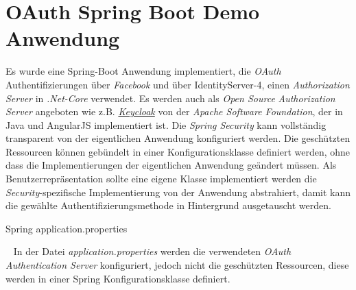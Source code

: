 \section{OAuth Spring Boot Demo Anwendung}
Es wurde eine Spring-Boot Anwendung implementiert, die \emph{OAuth} Authentifizierungen über \emph{Facebook} und über IdentityServer-4, einen \emph{Authorization Server} in \emph{.Net-Core} verwendet. Es werden auch als \emph{Open Source} \emph{Authorization Server} angeboten wie z.B. \href{http://www.keycloak.org/}{\emph{Keycloak}} von der \emph{Apache Software Foundation}, der in Java und AngularJS implementiert ist. 
\newline
\newline
Die \emph{Spring Security} kann vollständig transparent von der eigentlichen Anwendung konfiguriert werden. Die geschützten Ressourcen können gebündelt in einer Konfigurationsklasse definiert werden, ohne dass die Implementierungen der eigentlichen Anwendung geändert müssen. Als Benutzerrepräsentation sollte eine eigene Klasse implementiert werden die \emph{Security}-spezifische Implementierung von der Anwendung abstrahiert, damit kann die gewählte Authentifizierungsmethode in Hintergrund ausgetauscht werden.

\begin{code}
	\caption{Spring application.properties}
	\label{source:epidemiology-logistic}
\end{code}
\ \newline
\newline
In der Datei \emph{application.properties} werden die verwendeten \emph{OAuth Authentication Server} konfiguriert, jedoch nicht die geschützten Ressourcen, diese werden in einer Spring Konfigurationsklasse definiert.
\newpage

